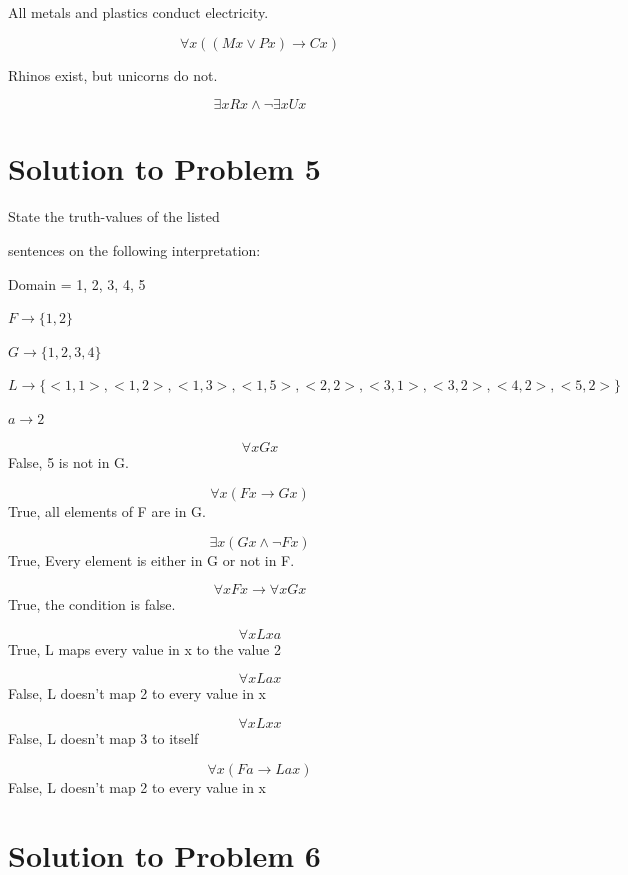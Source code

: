 \documentclass[12pt]{article}
\begin{document}
All metals and plastics conduct electricity.

\[ \forall x ((Mx \lor Px) \rightarrow Cx) \]

Rhinos exist, but unicorns do not.

\[ \exists x Rx \land \neg \exists x Ux \]

\section*{Solution to Problem 5}

State the truth-values of the listed

sentences on the following interpretation:

Domain = {1, 2, 3, 4, 5}


$F \rightarrow \{1, 2\}$

$G \rightarrow \{1, 2, 3, 4\}$

$L \rightarrow \{<1,1>, <1,2>, <1,3>, <1, 5>, <2, 2>, <3, 1>, <3,2>,<4, 2>, <5, 2>\}$

$a \rightarrow 2$

\[ \forall x Gx \]
False, 5 is not in G.

\[ \forall x(Fx \rightarrow Gx) \]
True, all elements of F are in G.

\[ \exists x(Gx \land \lnot Fx) \]
True, Every element is either in G or not in F.

\[ \forall x F x \rightarrow \forall x G x \]
True, the condition is false. 

\[ \forall x Lxa \]
True, L maps every value in x to the value 2

\[ \forall x Lax \]
False, L doesn't map 2 to every value in x

\[ \forall x Lxx \]
False, L doesn't map 3 to itself

\[ \forall x(Fa \rightarrow Lax) \]
False, L doesn't map 2 to every value in x


\section*{Solution to Problem 6}
\end{document}
